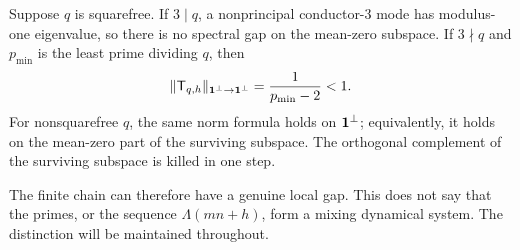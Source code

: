 \begin{corollary}
\label{cor:local-gap}
Suppose $q$ is squarefree.  If $3\mid q$, a nonprincipal conductor-$3$
mode has modulus-one eigenvalue, so there is no spectral gap on the
mean-zero subspace.  If $3\nmid q$ and $p_{\min}$ is the least prime
dividing $q$, then
\begin{equation}\label{eq:mean-zero-norm}
 \|\mathsf T_{q,h}\|_{\mathbf 1^\perp\to\mathbf 1^\perp}
 =\frac1{p_{\min}-2}<1.
\end{equation}
For nonsquarefree $q$, the same norm formula holds on $\mathbf 1^\perp$;
equivalently, it holds on the mean-zero part of the surviving subspace.
The orthogonal complement of the surviving subspace is killed in one step.
\end{corollary}

The finite chain can therefore have a genuine local gap.  This does not say
that the primes, or the sequence $\Lambda(mn+h)$, form a mixing dynamical
system.  The distinction will be maintained throughout.
